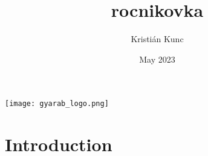 \documentclass{article}
\title{rocnikovka}
\author{Kristián Kunc}
\date{May 2023}
\begin{document}
\centering
\texttt{[image: gyarab\_logo.png]}
\maketitle

\section{Introduction}
\end{document}
